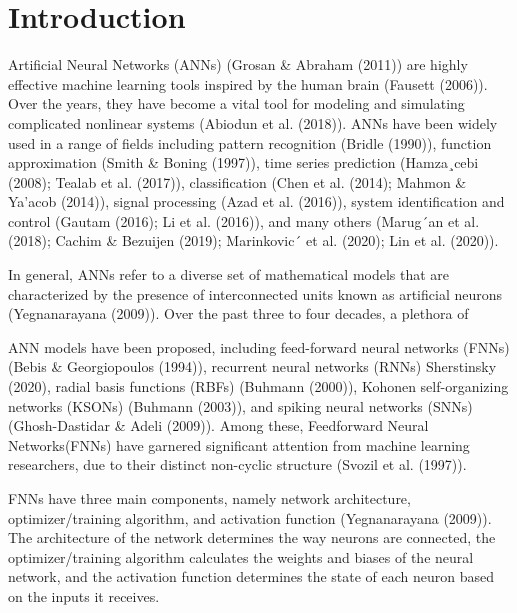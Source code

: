 \section{Introduction}

Artificial Neural Networks (ANNs) (Grosan \& Abraham (2011)) are highly effective machine learning tools inspired by the human brain (Fausett (2006)). Over the years, they have become a vital tool for modeling and simulating complicated nonlinear systems (Abiodun et al. (2018)). ANNs have been widely used in a range of fields including pattern recognition (Bridle (1990)), function approximation (Smith \& Boning (1997)), time series prediction (Hamza¸cebi (2008); Tealab et al. (2017)), classification (Chen et al. (2014); Mahmon \& Ya’acob (2014)), signal processing (Azad et al. (2016)), system identification and control (Gautam (2016); Li et al. (2016)), and many others (Marug´an et al. (2018); Cachim \& Bezuijen (2019); Marinkovic´ et al. (2020); Lin et al. (2020)).

In general, ANNs refer to a diverse set of mathematical models that are characterized by the presence of interconnected units known as artificial neurons (Yegnanarayana (2009)). Over the past three to four decades, a plethora of

ANN models have been proposed, including feed-forward neural networks (FNNs) (Bebis \& Georgiopoulos (1994)), recurrent neural networks (RNNs) Sherstinsky (2020), radial basis functions (RBFs) (Buhmann (2000)), Kohonen self-organizing networks (KSONs) (Buhmann (2003)), and spiking neural networks (SNNs) (Ghosh-Dastidar \& Adeli (2009)). Among these, Feedforward Neural Networks(FNNs) have garnered significant attention from machine learning researchers, due to their distinct non-cyclic structure (Svozil et al. (1997)).

FNNs have three main components, namely network architecture, optimizer/training algorithm, and activation function (Yegnanarayana (2009)). The architecture of the network determines the way neurons are connected, the optimizer/training algorithm calculates the weights and biases of the neural network, and the activation function determines the state of each neuron based on the inputs it receives.

